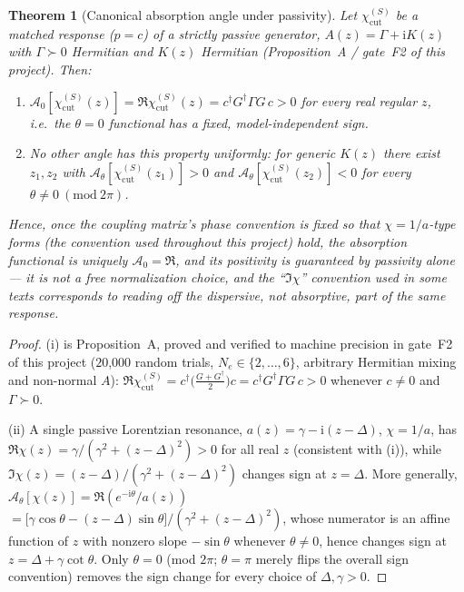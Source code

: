 \documentclass[11pt,a4paper]{article}
\newtheorem{theorem}{Theorem}[section]
\theoremstyle{remark}
\newcommand{\im}{\mathrm{i}}
\begin{document}
\begin{theorem}[Canonical absorption angle under passivity]\label{thm:L13}
Let $\chi_{\mathrm{cut}}^{(S)}$ be a matched response
($p=c$) of a strictly passive generator, $A(z)=\Gamma+\im K(z)$ with
$\Gamma\succ0$ Hermitian and $K(z)$ Hermitian (Proposition~A / gate~F2 of
this project). Then:
\begin{enumerate}[label=(\roman*)]
\item $\mathcal A_0[\chi_{\mathrm{cut}}^{(S)}(z)]=\Re\chi_{\mathrm{cut}}^{(S)}(z)
=c^\dagger G^\dagger\Gamma G\,c>0$ for every real regular $z$, i.e.\ the
$\theta=0$ functional has a fixed, model-independent sign.
\item No other angle has this property uniformly: for generic $K(z)$ there
exist $z_1,z_2$ with $\mathcal A_\theta[\chi_{\mathrm{cut}}^{(S)}(z_1)]>0$
and $\mathcal A_\theta[\chi_{\mathrm{cut}}^{(S)}(z_2)]<0$ for every
$\theta\neq0\ (\mathrm{mod}\ 2\pi)$.
\end{enumerate}
Hence, once the coupling matrix's phase convention is fixed so that
$\chi=1/a$-type forms (the convention used throughout this project) hold,
the absorption functional is uniquely $\mathcal A_0=\Re$, and its
positivity is guaranteed by passivity alone --- it is not a free
normalization choice, and the ``$\Im\chi$'' convention used in some texts
corresponds to reading off the \emph{dispersive}, not absorptive, part of
the same response.
\end{theorem}

\begin{proof}
(i) is Proposition~A, proved and verified to machine precision in gate~F2
of this project ($20$,$000$ random trials, $N_e\in\{2,\dots,6\}$, arbitrary
Hermitian mixing and non-normal $A$): $\Re\chi_{\mathrm{cut}}^{(S)}=
c^\dagger\bigl(\tfrac{G+G^\dagger}2\bigr)c=c^\dagger G^\dagger\Gamma G\,c>0$
whenever $c\neq0$ and $\Gamma\succ0$.

(ii) A single passive Lorentzian resonance, $a(z)=\gamma-\im(z-\Delta)$,
$\chi=1/a$, has
$\Re\chi(z)=\gamma/(\gamma^2+(z-\Delta)^2)>0$ for all real $z$ (consistent
with (i)), while
$\Im\chi(z)=(z-\Delta)/(\gamma^2+(z-\Delta)^2)$
changes sign at $z=\Delta$. More generally,
$\mathcal A_\theta[\chi(z)]=\Re(e^{-\im\theta}/a(z))$
$=\bigl[\gamma\cos\theta-(z-\Delta)\sin\theta\bigr]/(\gamma^2+(z-\Delta)^2)$,
whose numerator is an affine function of $z$ with nonzero slope
$-\sin\theta$ whenever $\theta\neq0$, hence changes sign at
$z=\Delta+\gamma\cot\theta$. Only $\theta=0$ (mod $2\pi$; $\theta=\pi$
merely flips the overall sign convention) removes the sign change for
every choice of $\Delta,\gamma>0$.
\end{proof}
\end{document}
